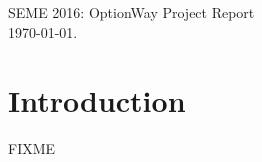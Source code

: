\documentclass{article}
\newcommand{\thetitle}{SEME 2016: OptionWay Project Report}
\begin{document}
\begin{center}
  \thetitle{}\\
  \today.
\end{center}

\section{Introduction}

FIXME
\end{document}
